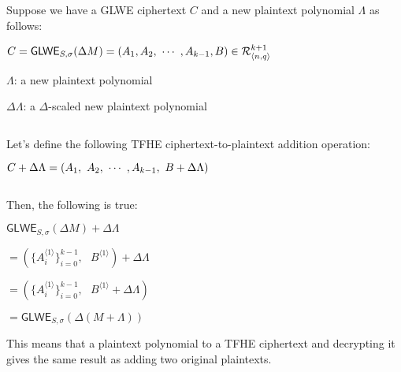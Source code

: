 Suppose we have a GLWE ciphertext $C$ and a new plaintext polynomial $\Lambda$ as follows: 


$C = \textsf{GLWE}_{S, \sigma}(\Delta M) = ( A_1, A_2, \text{ } \text{$\cdots$} \text{ }, A_{k-1}, B) \in \mathcal{R}_{\langle n,q \rangle}^{k + 1}$

$\Lambda$: a new plaintext polynomial

$\Delta \Lambda$: a $\Delta$-scaled new plaintext polynomial

$ $

\noindent Let's define the following TFHE ciphertext-to-plaintext addition operation: 

$C + \Delta\Lambda = ( A_1, \text{ } A_2, \text{ } \text{$\cdots$} \text{ }, A_{k-1}, \text{ } B + \Delta \Lambda)$

$ $

\noindent Then, the following is true:

\begin{tcolorbox}[title={\textbf{\tboxlabel{\ref*{sec:glwe-add-plain}} GLWE Homomorphic Addition with a Plaintext}}]
$\textsf{GLWE}_{S, \sigma}(\Delta M) + \Delta\Lambda $

$=  (\{A_i^{\langle 1 \rangle}\}_{i=0}^{k-1}, \text{ } B^{\langle 1 \rangle}) + \Delta\Lambda$

$=  (\{A_i^{\langle 1 \rangle}\}_{i=0}^{k-1}, \text{ } B^{\langle 1 \rangle} + \Delta\Lambda)$

$= \textsf{GLWE}_{S, \sigma}(\Delta (M + \Lambda) )$
\end{tcolorbox}


This means that a plaintext polynomial to a TFHE ciphertext and decrypting it gives the same result as adding two original plaintexts. 




